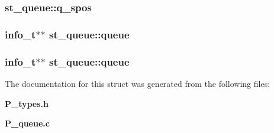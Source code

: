 \subsubsection{ st\_\-queue::q\_\-spos}\label{structst__queue_m0}


\subsubsection{\setlength{\rightskip}{0pt plus 5cm}info\_\-t$\ast$$\ast$ st\_\-queue::queue}\label{structst__queue_m5}


\subsubsection{\setlength{\rightskip}{0pt plus 5cm}info\_\-t$\ast$$\ast$ st\_\-queue::queue}\label{structst__queue_m3}




The documentation for this struct was generated from the following files:\begin{CompactItemize}
\item 
{\bf P\_\-types.h}\item 
{\bf P\_\-queue.c}\end{CompactItemize}
